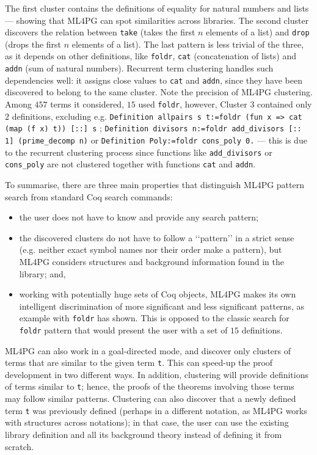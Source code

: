 The first cluster contains the definitions of equality for natural numbers and lists --- showing that
ML4PG can spot similarities across libraries. The second cluster discovers the relation between \lstinline?take? (takes the first $n$ elements of
a list) and \lstinline?drop? (drops the first $n$ elements of a list).
The last pattern is less trivial of the three, as it depends on
other definitions, like \lstinline?foldr?, \lstinline?cat? (concatenation of lists) and \lstinline?addn? (sum
of natural numbers).
Recurrent term clustering handles such dependencies well: it assigns close values to \lstinline?cat? and \lstinline?addn?,  since they have been discovered to belong to the same cluster.
Note the precision of ML4PG clustering. Among $457$ terms it considered, $15$ used \lstinline?foldr?, however,  Cluster 3 contained only $2$ definitions, excluding e.g.
\lstinline?Definition allpairs s t:=foldr (fun x => cat (map (f x) t)) [::] s? ; \lstinline?Definition divisors n:=foldr add_divisors [:: 1] (prime_decomp n)?  or \lstinline?Definition Poly:=foldr cons_poly 0.? --- this is due to the recurrent clustering process since functions like \lstinline?add_divisors? or \lstinline?cons_poly? are not clustered together with functions \lstinline?cat? and \lstinline?addn?.


To summarise, there are three main properties that distinguish ML4PG pattern search from standard Coq search commands:
\begin{itemize}
	\item the user does not have to know and provide any search pattern;
	\item the discovered clusters do not have to follow a \lq\lq{}pattern\rq\rq{} in a strict sense (e.g. neither exact symbol names nor their order make a pattern), but ML4PG considers structures and background information found in the library; and,
	\item working with potentially huge sets of Coq objects, ML4PG makes its own intelligent discrimination of more significant and less significant patterns,
	as example with \lstinline?foldr? has shown. This is opposed to the classic search for \lstinline?foldr? pattern that would present the user with a set of $15$ definitions.
\end{itemize}


ML4PG can also work in a goal-directed mode,
and discover only clusters of terms that are similar to the given term \lstinline?t?.
This can speed-up the proof development in two different ways.
In addition, clustering will provide definitions of terms similar to \lstinline?t?;
hence, the proofs of the theorems
involving those terms may follow similar patterns.
Clustering can also discover that a newly defined term \lstinline?t? was previously defined (perhaps in a different notation, as ML4PG works with structures across notations);
in that case, the user can use the existing library definition and all its background theory instead of defining it from scratch.
